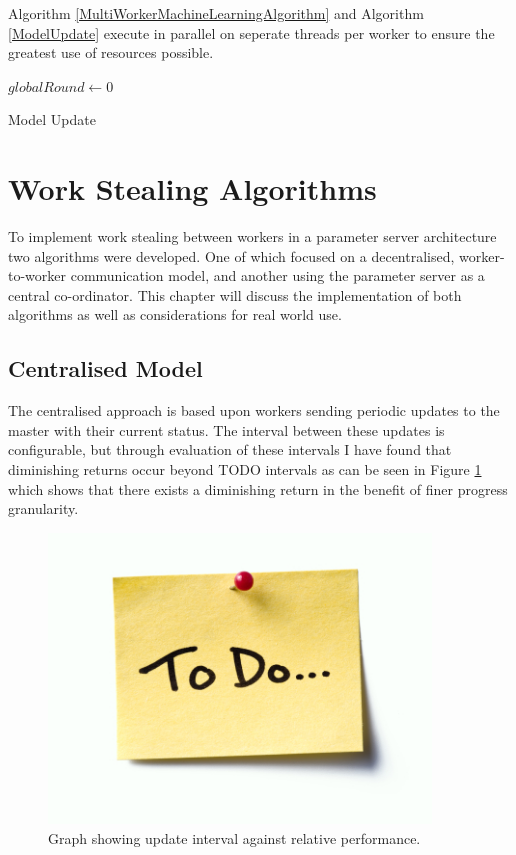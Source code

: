 \documentclass[12pt]{article}
\begin{document}
\medskip
\medskip

Algorithm \ref{MultiWorkerMachineLearningAlgorithm} and Algorithm \ref{ModelUpdate} execute in parallel on seperate threads per worker to ensure the greatest use of resources possible.
\newline

\IncMargin{1em}
\begin{algorithm}[H]
  $globalRound \longleftarrow 0$\;
 \caption{Model Update}
 \label{ModelUpdate}
\end{algorithm}
\DecMargin{1em}
\medskip

\newpage

\section{Work Stealing Algorithms} \label{algorithms}

To implement work stealing between workers in a parameter server architecture two algorithms were developed. One of which focused on a decentralised, worker-to-worker communication model, and another using the parameter server as a central co-ordinator. This chapter will discuss the implementation of both algorithms as well as considerations for real world use.

\subsection{Centralised Model}

The centralised approach is based upon workers sending periodic updates to the master with their current status. The interval between these updates is configurable, but through evaluation of these intervals I have found that diminishing returns occur beyond TODO intervals as can be seen in Figure \ref{IntervalGraph} which shows that there exists a diminishing return in the benefit of finer progress granularity.

\begin{figure}[H]
  \centering
  \includegraphics[width=4in]{todo}
  \caption[]{Graph showing update interval against relative performance.}
  \label{IntervalGraph}
\end{figure}
\end{document}
